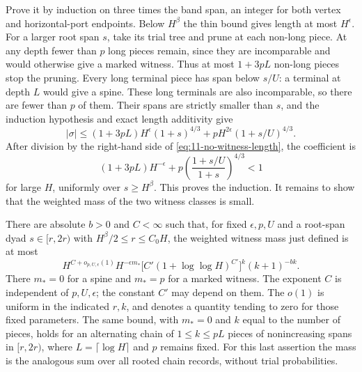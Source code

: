 Prove it by induction on three times the band span, an integer for
both vertex and horizontal-port endpoints. Below $H^\beta$ the thin
bound gives length at most $H^\epsilon$. For a larger root span $s$,
take its trial tree and prune at each non-long piece. At any depth
fewer than $p$ long pieces remain, since they are incomparable and
would otherwise give a marked witness. Thus at most $1+3pL$ non-long
pieces stop the pruning. Every long terminal piece has span below
$s/U$: a terminal at depth $L$ would give a spine. These long terminals
are also incomparable, so there are fewer than $p$ of them. Their
spans are strictly smaller than $s$, and the induction hypothesis
and exact length additivity give
\[
 |\sigma|\le (1+3pL)H^\epsilon(1+s)^{4/3}
       +pH^{2\epsilon}(1+s/U)^{4/3}.
\]
After division by the right-hand side of
\eqref{eq:11-no-witness-length}, the coefficient is
\[
 (1+3pL)H^{-\epsilon}
 +p\left(\frac{1+s/U}{1+s}\right)^{4/3}<1
\]
for large $H$, uniformly over $s\ge H^\beta$. This proves the
induction. It remains to show that the weighted mass of the two
witness classes is small.

\begin{lemma}\label{lem:11-chain}
There are absolute $b>0$ and $C<\infty$ such that, for fixed
$\epsilon,p,U$ and a root-span dyad $s\in[r,2r)$ with
$H^\beta/2\le r\le C_0H$, the weighted witness mass just defined is at most
\begin{equation}
 H^{C+o_{p,U,\epsilon}(1)}H^{-\epsilon m_*}
 \bigl[C'(1+\log\log H)^{C'}\bigr]^k(k+1)^{-bk}.
 \label{eq:L-39}
\end{equation}
There $m_*=0$ for a spine and $m_*=p$ for a
marked witness. The exponent
$C$ is independent of $p,U,\epsilon$; the constant $C'$ may depend on
them. The $o(1)$ is uniform in the indicated $r,k$, and denotes a
quantity tending to zero for those fixed parameters. The same bound,
with $m_*=0$ and $k$ equal to the number of pieces, holds for an
alternating chain of $1\le k\le pL$ pieces of nonincreasing spans in
$[r,2r)$, where $L=\lceil\log H\rceil$ and $p$ remains fixed.
For this last assertion the mass is the analogous sum over all
rooted chain records, without trial probabilities.
\end{lemma}

